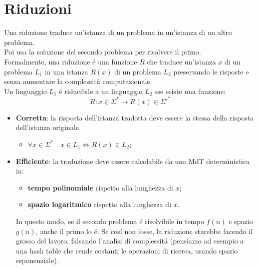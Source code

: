 \section{Riduzioni}
\label{sec:riduzioni}
Una riduzione traduce un'istanza di un problema in un'istanza di un altro problema. \\
Poi usa la soluzione del secondo problema per risolvere il primo. \\

Formalmente, una riduzione é una funzione $R$ che traduce un'istanza $x$ di un problema $L_1$ in una istanza $R(x)$ di un problema $L_2$
preservando le risposte e senza aumentare la complessità computazionale. \\

Un linguaggio $L_1$ é riducibile a un linguaggio $L_2$ sse esiste una funzione:
\[
R : x \in \Sigma^* \to R(x) \in \Sigma'^*
\]
\begin{itemize}
    \item \textbf{Corretta}: la risposta dell'istanza tradotta deve essere la stessa della risposta dell'istanza originale.
        \begin{itemize}
        \item $\forall x \in \Sigma^* \quad x \in L_1 \iff R(x) \in L_2$;
        \end{itemize}
    \item \textbf{Efficiente}: la traduzione deve essere calcolabile da una MdT deterministica in:
        \begin{itemize}
        \item \textbf{tempo polinomiale} rispetto alla lunghezza di $x$;
        \item \textbf{spazio logaritmico} rispetto alla lunghezza di $x$.
    \end{itemize}

    In questo modo, se il secondo problema é risolvibile in tempo $f(n)$ e spazio $g(n)$, anche il primo lo é.
    Se cosí non fosse, la riduzione starebbe facendo il grosso del lavoro, falsando l'analisi di complessitá
    (pensiamo ad esempio a una hash table che rende costanti le operazioni di ricerca, usando spazio esponenziale).
\end{itemize}


